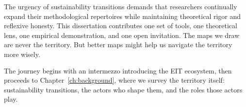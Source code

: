 \documentclass[../main.tex]{subfiles}
\begin{document}
The urgency of sustainability transitions demands that researchers continually expand their methodological repertoires while maintaining theoretical rigor and reflexive honesty. This dissertation contributes one set of tools, one theoretical lens, one empirical demonstration, and one open invitation. The maps we draw are never the territory. But better maps might help us navigate the territory more wisely.

The journey begins with an intermezzo introducing the EIT ecosystem, then proceeds to Chapter~\ref{ch:background}, where we survey the territory itself: sustainability transitions, the actors who shape them, and the roles those actors play.

\clearpage
\end{document}
